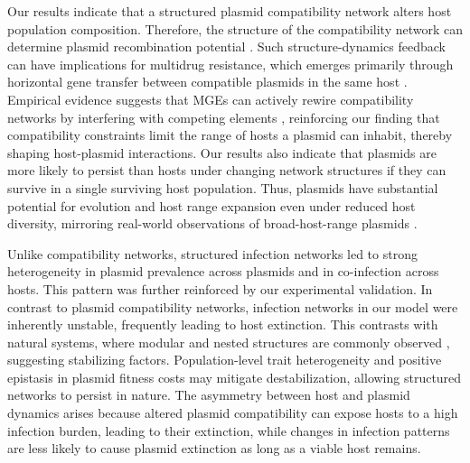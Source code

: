 \documentclass[10pt,letterpaper]{article}
\begin{document}
Our results indicate that a structured plasmid compatibility network alters host population composition. Therefore, the structure of the compatibility network can determine plasmid recombination potential \cite{Dionisio2019-mh}. Such structure-dynamics feedback can have implications for multidrug resistance, which emerges primarily through horizontal gene transfer between compatible plasmids in the same host \cite{Lam2019-de, Wang2024-hv}. Empirical evidence suggests that MGEs can actively rewire compatibility networks by interfering with competing elements \cite{Rocha2022-ub}, reinforcing our finding that compatibility constraints limit the range of hosts a plasmid can inhabit, thereby shaping host-plasmid interactions. Our results also indicate that plasmids are more likely to persist than hosts under changing network structures if they can survive in a single surviving host population. Thus, plasmids have substantial potential for evolution and host range expansion even under reduced host diversity, mirroring real-world observations of broad-host-range plasmids \cite{Hall2021-lo}.

Unlike compatibility networks, structured infection networks led to strong heterogeneity in plasmid prevalence across plasmids and in co-infection across hosts. This pattern was further reinforced by our experimental validation. In contrast to plasmid compatibility networks, infection networks in our model were inherently unstable, frequently leading to host extinction. This contrasts with natural systems, where modular and nested structures are commonly observed \cite{Flores2011-fx, Beckett2013-tz, Kauffman2022-ok}, suggesting stabilizing factors. Population-level trait heterogeneity and positive epistasis in plasmid fitness costs \cite{San_Millan2014-ak, Igler2022-lv} may mitigate destabilization, allowing structured networks to persist in nature. The asymmetry between host and plasmid dynamics arises because altered plasmid compatibility can expose hosts to a high infection burden, leading to their extinction, while changes in infection patterns are less likely to cause plasmid extinction as long as a viable host remains.
\end{document}
